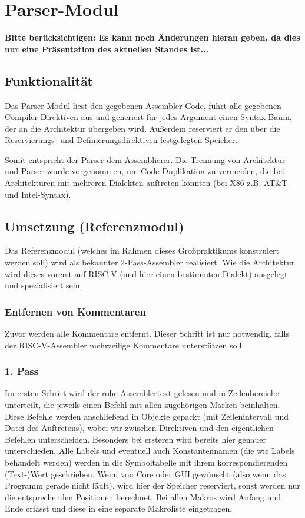 \documentclass[a4paper]{article}
\begin{document}
\section{Parser-Modul}
\textbf{Bitte berücksichtigen: Es kann noch Änderungen hieran geben, da dies nur eine Präsentation des aktuellen Standes ist...}
\subsection{Funktionalität}
Das Parser-Modul liest den gegebenen Assembler-Code,
führt alle gegebenen Compiler-Direktiven aus und generiert für jedes Argument einen Syntax-Baum,
der an die Architektur übergeben wird.
Außerdem reserviert er den über die Reservierungs- und Definierungsdirektiven festgelegten Speicher.

Somit entspricht der Parser dem Assemblierer.
Die Trennung von Architektur und Parser wurde vorgenommen,
um Code-Duplikation zu vermeiden,
die bei Architekturen mit mehreren Dialekten auftreten könnten (bei X86 z.B. AT\&T- und Intel-Syntax).
\subsection{Umsetzung (Referenzmodul)}
Das Referenzmodul (welches im Rahmen dieses Großpraktikums konstruiert werden soll) wird als bekannter 2-Pass-Assembler realisiert. Wie die Architektur wird dieses vorerst auf RISC-V (und hier einen bestimmten Dialekt) ausgelegt und spezialisiert sein.
\subsubsection{Entfernen von Kommentaren}
Zuvor werden alle Kommentare entfernt. Dieser Schritt ist nur notwendig, falls der RISC-V-Assembler mehrzeilige Kommentare unterstützen soll.
\subsubsection{1. Pass}
Im ersten Schritt wird der rohe Assemblertext gelesen und in Zeilenbereiche unterteilt, die jeweils einen Befehl mit allen zugehörigen Marken beinhalten.
Diese Befehle werden anschließend in Objekte gepackt (mit Zeilenintervall und Datei des Auftretens), wobei wir zwischen Direktiven und den eigentlichen Befehlen unterscheiden.
Besonders bei ersteren wird bereits hier genauer unterschieden.
Alle Labels und eventuell auch Konstantennamen (die wie Labels behandelt werden) werden in die Symboltabelle mit ihrem korrespondierenden (Text-)Wert geschrieben.
Wenn von Core oder GUI gewünscht (also wenn das Programm gerade nicht läuft), wird hier der Speicher reserviert, sonst werden nur die entsprechenden Positionen berechnet.
Bei allen Makros wird Anfang und Ende erfasst und diese in eine separate Makroliste eingetragen.
\end{document}
